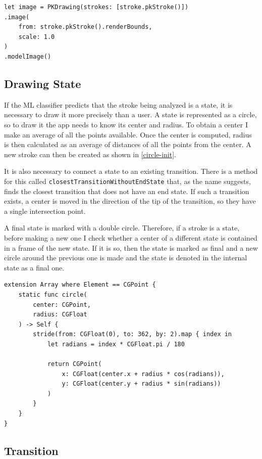 \begin{lstlisting}[caption=Automata classifier, label=strokes-conversion]
let image = PKDrawing(strokes: [stroke.pkStroke()])
.image(
    from: stroke.pkStroke().renderBounds,
    scale: 1.0
)
.modelImage()
\end{lstlisting}

\subsection{Drawing State}

If the ML classifier predicts that the stroke being analyzed is a state, it is necessary to draw it more precisely than a user. A state is represented as a circle, so to draw it the app needs to know its center and radius. To obtain a center I make an average of all the points available. Once the center is computed, radius is then calculated as an average of distances of all the points from the center. A new stroke can then be created as shown in \ref{circle-init}.

It is also necessary to connect a state to an existing transition. There is a method for this called \lstinline{closestTransitionWithoutEndState} that, as the name suggests, finds the closest transition that does not have an end state. If such a transition exists, a center is moved in the direction of the tip of the transition, so they have a single intersection point.

A final state is marked with a double circle. Therefore, if a stroke is a state, before making a new one I check whether a center of a different state is contained in a frame of the new state. If it is so, then the state is marked as final and a new circle around the previous one is made and the state is denoted in the internal state as a final one.

\begin{lstlisting}[caption=Circle stroke, label=circle-init]
extension Array where Element == CGPoint {
    static func circle(
        center: CGPoint,
        radius: CGFloat
    ) -> Self {
        stride(from: CGFloat(0), to: 362, by: 2).map { index in
            let radians = index * CGFloat.pi / 180
            
            return CGPoint(
                x: CGFloat(center.x + radius * cos(radians)),
                y: CGFloat(center.y + radius * sin(radians))
            )
        }
    }
}
\end{lstlisting}

\subsection{Transition}

